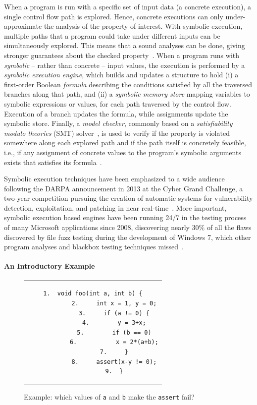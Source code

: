 When a program is run with a specific set of input data (a concrete execution), a single control flow path is explored. Hence, concrete executions can only under-approximate the analysis of the property of interest. With symbolic execution, multiple paths that a program could take under different inputs can be simultaneously explored. This means that a sound analyses can be done, giving stronger guarantees about the checked property~\cite{Baldoni:2018:SSE:3212709.3182657}. When a program runs with {\em symbolic} -- rather than concrete -- input values, the execution is performed by a {\em symbolic execution engine}, which builds and updates a structure to hold (i) a first-order Boolean {\em formula} describing the conditions satisfied by all the traversed branches along that path, and (ii) a {\em symbolic memory store} mapping variables to symbolic expressions or values, for each path traversed by the control flow. Execution of a branch updates the formula, while assignments update the symbolic store. Finally, a {\em model checker}, commonly based on a {\em satisfiability modulo theories} (SMT) solver~\cite{BKM14}, is  used to verify if the property is violated somewhere along each explored path and if the path itself is concretely feasible, i.e., if any assignment of concrete values to the program's symbolic arguments exists that satisfies its formula~\cite{Baldoni:2018:SSE:3212709.3182657}.

Symbolic execution techniques have been emphasized to a wide audience following the DARPA announcement in 2013 at the Cyber Grand Challenge, a two-year competition pursuing the creation of automatic systems for vulnerability detection, exploitation, and patching in near real-time~\cite{ANGR-SSP16}.
More important, symbolic execution based engines have been running 24/7 in the testing process of many Microsoft applications since 2008, discovering nearly 30\% of all the flaws discovered by file fuzz testing during the development of Windows 7, which other program analyses and blackbox testing techniques missed~\cite{SAGE-QUEUE12}.

\paragraph{An Introductory Example}


\label{symbolic-execution-example}
\begin{figure}[t]
	\begin{center}
		\begin{tabular}{c}
			\begin{lstlisting}[basicstyle=\ttfamily\scriptsize]
			1.  void foo(int a, int b) {
			2.     int x = 1, y = 0;
			3.     if (a != 0) {
			4.        y = 3+x;
			5.        if (b == 0)
			6.           x = 2*(a+b);
			7.     }
			8.     assert(x-y != 0);
			9.  }
			\end{lstlisting}
		\end{tabular}
	\end{center}
	\vspace{-2mm}
	\caption{Example: which values of \texttt{a} and \texttt{b} make the \texttt{assert} fail?}
	\label{fig:example-1}
	\vspace{-1.5mm}
\end{figure}

